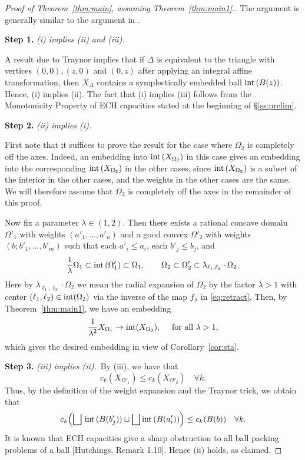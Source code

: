 \documentclass[11pt, reqno]{amsart}
\theoremstyle{remark}
\numberwithin{equation}{subsection}
\numberwithin{figure}{section}
\theoremstyle{customremark}
\newcommand{\intt}{{\rm int}}
\newcommand{\NI}{{\noindent}}
\newcommand{\Om}{{\Omega}}
\newcommand{\la}{{\lambda}}
\newcommand{\MS}{{\medskip}}
\begin{document}
\begin{proof}[Proof of Theorem~\ref{thm:main}, assuming Theorem~\ref{thm:main1}.]

The argument is generally similar to the argument in \cite{CG, Mell}.
\MS

\NI {\bf Step 1.} { \it (i) implies (ii) and (iii).}

A result due to Traynor  \cite{Traynor} implies that if $\Delta$ is equivalent to the triangle with vertices $(0,0), (z,0)$ and $(0,z)$ after applying an integral affine transformation, then $X_\Delta$ contains a symplectically embedded ball $\intt\,(B(z))$.  Hence, (i) implies (ii).
The fact that (i) implies (iii) follows from the Monotonicity Property of ECH capacities stated at the beginning of \S\ref{ss:prelim}.

\MS


\NI {\bf Step 2.} {\it  (ii) implies (i).}   \

First note that it suffices to prove the result for the case where $\Omega_2$ is completely off the axes.  Indeed, an embedding into $\intt\, (X_{\Omega_2})$ in this case gives an embedding into the corresponding $\intt\, (X_{\Omega_2})$ in the other cases, since $\intt\, (X_{\Omega_2})$ is a subset of the interior in the other cases, and the weights in the other cases are the same.  We will therefore assume that $\Omega_2$ is completely off the axes in the remainder of this proof.

Now fix a parameter $\lambda \in (1,2)$.  Then there exists a rational concave domain  $\Omega'_1$ with weights $(a'_1, \ldots, a'_n)$ and a good convex $\Omega'_2$ with weights $(b; b'_1, \ldots, b'_m)$ such that 
each $a'_i \le a_i$, each $b'_j \le b_j$, and
\[ 
\frac{1}{\lambda} \Omega_1 \subset \intt\, (\Omega'_1) \subset \Omega_1, \qquad 
 \Omega_2 \subset \Omega'_2 \subset \lambda_{\ell_1,\ell_2} \cdot \Omega_2.\]
Here by $\lambda_{\ell_1,\ell_2} \cdot \Omega_2$ we mean the radial expansion of $\Om_2$ by the factor $\la>1$ with center $(\ell_1,\ell_2)\in \intt (\Om_2)$ via the inverse of the  map $f_\la$ in \eqref{eq:retract}.
Then, by Theorem~\ref{thm:main1}, we have an embedding
\[ \frac{1}{\lambda^2} X_{\Omega_1} \to \intt (X_{\Omega_2}), \quad \mbox{ for all } \la>1,
\]
which gives the desired embedding in view of Corollary~\ref{cor:sta}.
\MS



\NI
{\bf Step 3.}  {\it  (iii) implies (ii).}\
By (iii), we have that
\[ c_k(X_{\Omega'_1}) \le c_k(X_{\Omega'_2}) \quad \forall k.\]
Thus, by the definition of the weight expansion and the Traynor trick, we obtain that
\[ 
c_k\Bigl( \bigsqcup\, \intt\, (B(b'_j)) \sqcup \bigsqcup \intt\, (B(a'_i)) \Bigr) \le c_k(B(b)) \quad \forall k.
\]
It is known that ECH capacities give a sharp obstruction to all ball packing problems of a ball [Hutchings, Remark 1.10]. 
Hence (ii) holds, as claimed.
\end{proof}
\end{document}
